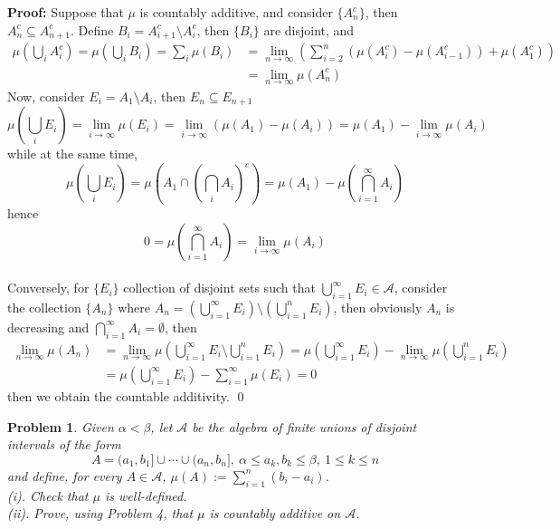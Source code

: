 \documentclass[12pt]{article}
\newtheorem{problem}{Problem}
\begin{document}
\textbf{Proof:} Suppose that $\mu$ is countably additive, and consider $\{A_n^c\}$, then $A_n^c\subseteq A_{n+1}^c$. Define $B_i=A_{i+1}^c\setminus A_i^c$, then $\{B_i\}$ are disjoint, and 
\begin{align*}
    \mu\left(\bigcup_i A_{i}^c\right)=\mu\left(\bigcup_i B_i\right)=\sum\limits_i\mu\left(B_i\right)&=\lim\limits_{n\to\infty}\left(\sum\limits_{i=2}^n\left(\mu(A_i^c)-\mu(A_{i-1}^c)\right)+\mu(A_1^c)\right) \\
    &= \lim\limits_{n\to\infty} \mu(A_n^c)
\end{align*}
Now, consider $E_i=A_1\setminus A_i$, then $E_n\subseteq E_{n+1}$
$$
    \mu\left(\bigcup_i E_i\right)=\lim\limits_{i\to\infty}\mu\left(E_i\right)=\lim\limits_{i\to\infty}(\mu(A_1)-\mu(A_i))=\mu(A_1)-\lim\limits_{i\to\infty}\mu(A_i )
$$
while at the same time, 
$$
    \mu\left(\bigcup_i E_i\right)=\mu\left(A_1\cap \left(\bigcap_i A_i\right)^c\right)=\mu(A_1)-\mu\left(\bigcap_{i=1}^\infty A_i\right)
$$ 
hence 
$$
    0=\mu\left(\bigcap_{i=1}^\infty A_i\right)=\lim\limits_{i\to\infty}\mu(A_i)
$$
\\
\indent Conversely, for $\{E_i\}$ collection of disjoint sets such that $\bigcup_{i=1}^\infty E_i\in\mathcal{A}$, consider the collection $\{A_n\}$ where $A_n=\left(\bigcup_{i=1}^\infty E_i\right)\setminus\left(\bigcup_{i=1}^nE_i\right)$, then obviously $A_n$ is decreasing and $\bigcap_{i=1}^\infty A_i=\emptyset$, then 
\begin{align*}            \lim\limits_{n\to\infty}\mu\left(A_n\right)&=\lim\limits_{n\to\infty}\mu\left(\bigcup_{i=1}^{\infty}E_i\setminus\bigcup_{i=1}^{n}E_i\right)=\mu\left(\bigcup_{i=1}^\infty E_i\right)-\lim\limits_{n\to\infty}\mu\left(\bigcup_{i=1}^nE_i\right) \\
&=\mu\left(\bigcup_{i=1}^\infty E_i\right)-\sum\limits_{i=1}^\infty\mu\left(E_i\right)=0
\end{align*}
then we obtain the countable additivity. \qed
\\
\begin{problem}
    Given $\alpha<\beta$, let $\mathcal{A}$ be the algebra of finite unions of disjoint intervals of the form 
    $$
        A=(a_1, b_1]\cup\cdots\cup(a_n,b_n], \ \alpha\leq a_k,b_k\leq \beta, \ 1\leq k\leq n
    $$
    and define, for every $A\in\mathcal{A}$, $\mu(A):=\sum\limits_{i=1}^n(b_i-a_i)$. \\
    \indent (i). Check that $\mu$ is well-defined. \\
    \indent (ii). Prove, using Problem 4, that $\mu$ is countably additive on $\mathcal{A}$.
\end{problem}
\end{document}
